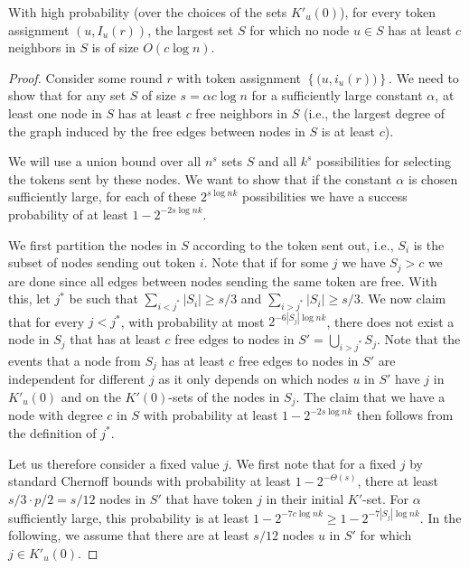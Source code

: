 \documentclass{llncs}
\newcommand{\set}[1]{\left\{#1\right\}}
\begin{document}
\begin{lemma}\label{lem:cconLB1}
    With high probability (over the choices of the sets $K'_u(0)$),
    for every token assignment $(u,I_u(r))$, the largest set $S$ for
    which no node $u\in S$ has at least $c$ neighbors in $S$ is of
    size $O(c\log n)$.
\end{lemma}
\begin{proof}
    Consider some round $r$ with token assignment
    $\set{\big(u,i_u(r)\big)}$. We need to show that for any set $S$
    of size $s=\alpha c\log n$ for a sufficiently large constant
    $\alpha$, at least one node in $S$ has at least $c$ free neighbors
    in $S$ (i.e., the largest degree of the graph induced by the free
    edges between nodes in $S$ is at least $c$). 

    We will use a union bound over all $n^s$ sets $S$ and all $k^s$
    possibilities for selecting the tokens sent by these nodes. We
    want to show that if the constant $\alpha$ is chosen sufficiently
    large, for each of these $2^{s \log nk}$ possibilities we have a
    success probability of at least $1 - 2^{-2s \log nk}$.

    We first partition the nodes in $S$ according to the token sent
    out, i.e., $S_i$ is the subset of nodes sending out token
    $i$. Note that if for some $j$ we have $S_j > c$ we are done since
    all edges between nodes sending the same token are free. With
    this, let $j^*$ be such that $\sum_{i<j^*} |S_i| \geq s/3$ and
    $\sum_{i>j^*} |S_i| \geq s/3$. We now claim that for every $j <
    j^*$, with probability at most $2^{-6|S_j|\log nk}$, there does
    not exist a node in $S_j$ that has at least $c$ free edges to
    nodes in $S' = \bigcup_{i>j^*} S_j$. Note that the events that a
    node from $S_j$ has at least $c$ free edges to nodes in $S'$ are
    independent for different $j$ as it only depends on which nodes
    $u$ in $S'$ have $j$ in $K'_u(0)$ and on the $K'(0)$-sets of
    the nodes in $S_j$. The claim that we have a node with degree $c$
    in $S$ with probability at least $1-2^{-2s\log nk}$ then follows
    from the definition of $j^*$.

    Let us therefore consider a fixed value $j$.  We first note that
    for a fixed $j$ by standard Chernoff bounds with probability at
    least $1-2^{-\Theta(s)}$, there at least $s/3 \cdot p/2=s/12$
    nodes in $S'$ that have token $j$ in their initial $K'$-set. For
    $\alpha$ sufficiently large, this probability is at least
    $1-2^{-7c \log nk} \geq 1-2^{-7|S_j| \log nk}$. In the following,
    we assume that there are at least $s/12$ nodes $u$ in $S'$ for
    which $j\in K'_u(0)$.


\end{proof}
\end{document}
